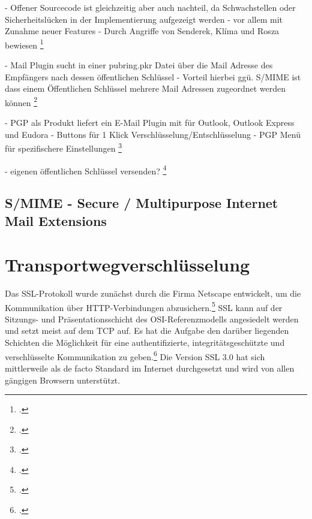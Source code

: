 \documentclass  [paper=a4,
				fontsize=12pt,
				listof=totoc,
				bibliography=totoc
				]{scrreprt}
\begin{document}
				- Offener Sourcecode ist gleichzeitig aber auch nachteil, da Schwachstellen oder Sicherheitslücken in der Implementierung aufgezeigt werden - vor allem mit Zunahme neuer Features
				- Durch Angriffe von Senderek, Klíma und Rosza bewiesen
				\footcite[][S. 47-55]{Schwenk}
				
				
				- Mail Plugin sucht in einer pubring.pkr Datei über die Mail Adresse des Empfängers nach dessen öffentlichen Schlüssel
				- Vorteil hierbei ggü. S/MIME ist dass einem Öffentlichen Schlüssel mehrere Mail Adressen zugeordnet werden können
				\footcite[][S. 40]{Schwenk}
				
				- PGP als Produkt liefert ein E-Mail Plugin mit für Outlook, Outlook Express und Eudora
				- Buttons für 1 Klick Verschlüsselung/Entschlüsselung
				- PGP Menü für spezifischere Einstellungen
				\footcite[][S. 38]{Schwenk}
				
				
				- eigenen öffentlichen Schlüssel versenden?
				\footcite[][S. 40]{Schwenk}
				
				
				
				
				
				
			\subsection{S/MIME - Secure / Multipurpose Internet Mail Extensions}
				
		\section{Transportwegverschlüsselung}
			Das \ac{SSL}-Protokoll wurde zunächst durch die Firma Netscape entwickelt, um die Kommunikation über \ac{HTTP}-Verbindungen abzusichern.\footcite[Vgl.][S. 796]{Eckert2013} \ac{SSL} kann auf der Sitzungs- und Präsentationsschicht des \ac{OSI}-Referenzmodells angesiedelt werden und setzt meist auf dem \ac{TCP} auf. Es hat die Aufgabe den darüber liegenden Schichten die Möglichkeit für eine authentifizierte, integritätsgeschützte und verschlüsselte Kommunikation zu geben.\footcite[Vgl.][S. 799 ff.]{Eckert2013}
			Die Version \ac{SSL} 3.0 hat sich mittlerweile als de facto Standard im Internet durchgesetzt und wird von allen gängigen Browsern unterstützt.\\
		
\end{document}
